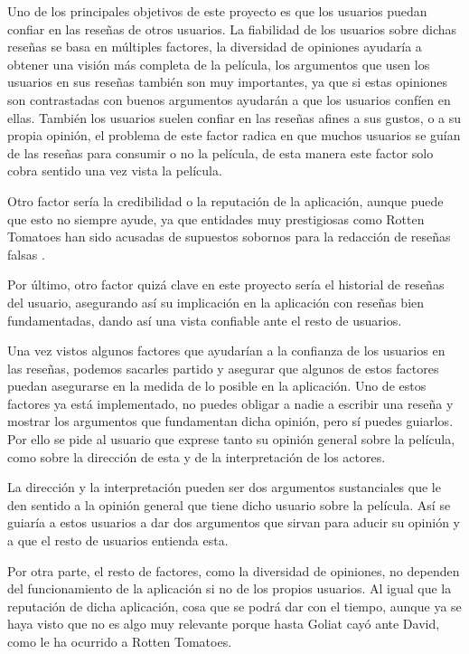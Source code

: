 Uno de los principales objetivos de este proyecto es que los usuarios puedan confiar en las reseñas de otros
usuarios. La fiabilidad de los usuarios sobre dichas reseñas se basa en múltiples factores, la diversidad de 
opiniones ayudaría a obtener una visión más completa de la película, los argumentos que usen los usuarios en sus 
reseñas también son muy importantes, ya que si estas opiniones son contrastadas con buenos argumentos ayudarán a que 
los usuarios confíen en ellas. También los usuarios suelen confiar en las reseñas afines a sus gustos, o a su propia 
opinión, el problema de este factor radica en que muchos usuarios se guían de las reseñas para consumir o no la 
película, de esta manera este factor solo cobra sentido una vez vista la película.

Otro factor sería la credibilidad o la reputación de la aplicación, aunque puede que esto no siempre ayude, ya que 
entidades muy prestigiosas como Rotten Tomatoes\cite{RottenTWeb} han sido acusadas de supuestos sobornos para la 
redacción de reseñas falsas \cite{RtVan}. 

Por último, otro factor quizá clave en este proyecto sería el historial de reseñas del usuario, asegurando así su 
implicación en la aplicación con reseñas bien fundamentadas, dando así una vista confiable ante el resto de usuarios.

Una vez vistos algunos factores que ayudarían a la confianza de los usuarios en las reseñas, podemos sacarles 
partido y asegurar que algunos de estos factores puedan asegurarse en la medida de lo posible en la aplicación. Uno 
de estos factores ya está implementado, no puedes obligar a nadie a escribir una reseña y mostrar los argumentos que 
fundamentan dicha opinión, pero sí puedes guiarlos. Por ello se pide al usuario que exprese tanto su opinión 
general sobre la película, como sobre la dirección de esta y de la interpretación de los actores. 

La dirección y la interpretación pueden ser dos argumentos sustanciales que le den sentido a la opinión general que 
tiene dicho usuario sobre la película. Así se guiaría a estos usuarios a dar dos argumentos que sirvan para aducir 
su opinión y a que el resto de usuarios entienda esta.

Por otra parte, el resto de factores, como la diversidad de opiniones, no dependen del funcionamiento de la 
aplicación si no de los propios usuarios. Al igual que la reputación de dicha aplicación, cosa que se podrá dar
con el tiempo, aunque ya se haya visto que no es algo muy relevante porque hasta Goliat cayó ante David, como le ha 
ocurrido a Rotten Tomatoes.

